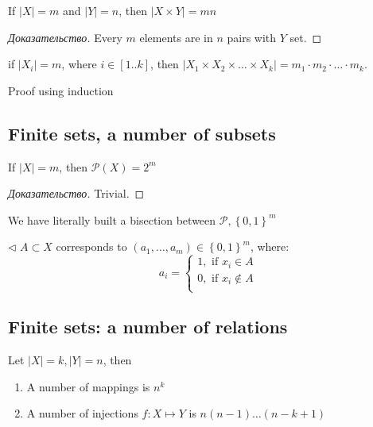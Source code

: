 \begin{lemma}
	If $|X| = m$ and $|Y| = n$, then $|X \times Y| = mn$
\end{lemma}

\begin{proof}[Доказательство]
	Every $m$ elements are in $n$ pairs with $Y$ set.
\end{proof}

\begin{corollary}[]
	if $|X_i| = m$, where $i \in [1..k]$, then $|X_1 \times X_2 \times  \dots \times X_k| = m_1 \cdot m_2 \cdot \dots \cdot m_{k}$.
\end{corollary}

\begin{exercise}
	Proof using induction
\end{exercise}

\subsection{Finite sets, a number of subsets}

\begin{theorem}[]
	If $|X| = m$, then  $\mathcal{P}(X) = 2^{m}$
\end{theorem}

\begin{proof}[Доказательство]
	Trivial.
\end{proof}

\begin{note}[]
	We have literally built a bisection between $\mathcal{P}, \left\{ 0,1 \right \}^{m} $ 
	
	$ \triangleleft $ $A \subset X$ corresponds to $(a_1, \dots , a_{m}) \in \left\{ 0, 1 \right \}^{m} $, where: \[
		a_i = \begin{cases}
			1, \text{ if } x_i \in A \\
			0, \text{ if } x_i \notin A \\
		\end{cases}
	\]
\end{note}

\subsection{Finite sets: a number of relations}

\begin{theorem}[]
	Let $|X| = k, |Y| = n$, then
	\begin{enumerate}
		\item A number of mappings is $n^{k}$
		\item A number of injections $f: X \mapsto Y$ is $n(n-1) \dots (n-k+1)$ 
	\end{enumerate}
\end{theorem}

